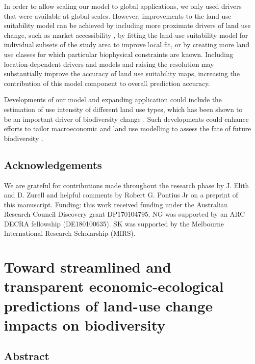 \documentclass[titlesmallcaps,copyrightpage]{uomthesis}\usepackage[]{graphicx}\usepackage[]{color}
\begin{document}
In order to allow scaling our model to global applications, we only used
drivers that were available at global scales. However, improvements to
the land use suitability model can be achieved by including more
proximate drivers of land use change, such as market accessibility
\citep{meiyappan_spatial_2014, verburg_global_2011}, by fitting the land
use suitability model for individual subsets of the study area to
improve local fit, or by creating more land use classes for which
particular biophysical constraints are known. Including
location-dependent drivers and models and raising the resolution may
substantially improve the accuracy of land use suitability maps,
increasing the contribution of this model component to overall
prediction accuracy.

Developments of our model and expanding application could include the
estimation of use intensity of different land use types, which has been
shown to be an important driver of biodiversity change
\citep{newbold_global_2015, newbold_has_2016}. Such developments could
enhance efforts to tailor macroeconomic and land use modelling to assess
the fate of future biodiversity \citep{kapitza_assessing_2021}.

\section{Acknowledgements}

We are grateful for contributions made throughout the research phase by
J. Elith and D. Zurell and helpful comments by Robert G. Pontius Jr on a
preprint of this manuscript. Funding: this work received funding under
the Australian Research Council Discovery grant DP170104795. NG was
supported by an ARC DECRA fellowship (DE180100635). SK was supported by
the Melbourne International Research Scholarship (MIRS).

\chapter{Toward streamlined and transparent economic-ecological predictions of land-use change impacts on biodiversity}
\label{ch4}
\newpage

\section{Abstract}
\end{document}
